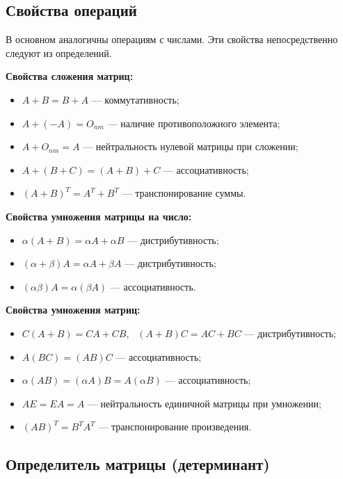 \documentclass[a4paper, 12pt]{article}
\begin{document}
\subsection{Свойства операций}

В основном аналогичны операциям с числами. Эти свойства непосредственно
следуют из определений.

\textbf{Свойства сложения матриц:}
\begin{itemize}[noitemsep]
  \item $A + B = B + A$ --- коммутативность;
  \item $A + (-A) = O_{nm}$ --- наличие противоположного элемента;
  \item $A + O_{nm} = A$ --- нейтральность нулевой матрицы при сложении;
  \item $A + (B + C) = (A + B) + C$ --- ассоциативность;
  \item $(A + B)^T = A^T + B^T$ --- транспонирование суммы.
\end{itemize}

\textbf{Свойства умножения матрицы на число:}
\begin{itemize}[noitemsep]
  \item $\alpha (A + B) = \alpha A + \alpha B$ --- дистрибутивность;
  \item $(\alpha + \beta) A = \alpha A + \beta A$ --- дистрибутивность;
  \item $(\alpha \beta) A = \alpha (\beta A)$ --- ассоциативность.
\end{itemize}

\textbf{Свойства умножения матриц:}
\begin{itemize}[noitemsep]
  \item $C (A + B) = CA + CB$, \ $(A + B) C = AC + BC$ --- дистрибутивность;
  \item $A (BC) = (AB) C$ --- ассоциативность;
  \item $\alpha (AB) = (\alpha A) B = A (\alpha B)$ --- ассоциативность;
  \item $AE = EA = A$ --- нейтральность единичной матрицы при умножении;
  \item $(AB)^T = B^T A^T$ --- транспонирование произведения.
\end{itemize}

\subsection{Определитель матрицы (детерминант)}
\end{document}

